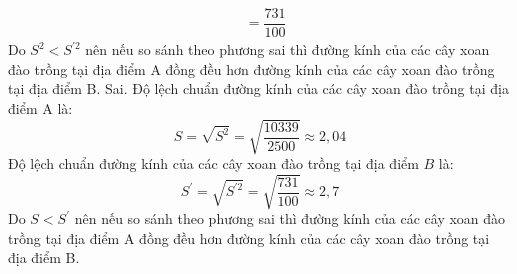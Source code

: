 \begin{ex}
{\begin{itemchoice}
\begin{align*}
				&=\dfrac{731}{100}
			\end{align*}
			Do $S^{2}<{S}^{\prime 2}$ nên nếu so sánh theo phương sai thì đường kính của các cây xoan đào trồng tại địa điểm A đồng đều hơn đường kính của các cây xoan đào trồng tại địa điểm B.
			\itemch Sai. Độ lệch chuẩn đường kính của các cây xoan đào trồng tại địa điểm A là:
			$${S}=\sqrt{{S}^{2}}=\sqrt{\dfrac{10339}{2500}} \approx 2{,}04$$
			Độ lệch chuẩn đường kính của các cây xoan đào trồng tại địa điểm $B$ là: $${S}^{\prime}=\sqrt{{S}^{\prime 2}}=\sqrt{\dfrac{731}{100}} \approx 2{,}7$$
			Do ${S}<{S}^{\prime}$ nên nếu so sánh theo phương sai thì đường kính của các cây xoan đào trồng tại địa điểm A đồng đều hơn đường kính của các cây xoan đào trồng tại địa điểm B.
		\end{itemchoice}
	}
\end{ex}

